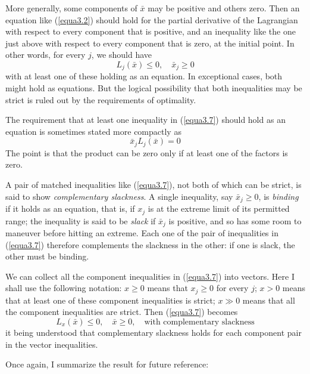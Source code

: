 More generally, some components of $\bar{x}$ may be positive and others zero. Then an equation like (\ref{equa3.2}) should hold for the partial derivative of the Lagrangian with respect to every component that is positive, and an inequality like the one just above with respect to every component that is zero, at the initial point. In other words, for every $j$, we should have
\begin{equation} \label{equa3.7}
L_j(\bar{x}) \leq 0 , \quad \bar{x}_j \geq 0
\end{equation}
with at least one of these holding as an equation. In exceptional cases, both might hold as equations. But the logical possibility that both inequalities may be strict is ruled out by the requirements of optimality.

The requirement that at least one inequality in (\ref{equa3.7}) should hold as an equation is sometimes stated more compactly as
\begin{equation*}
    \bar{x}_j  L_j(\bar{x}) = 0
\end{equation*}
The point is that the product can be zero only if at least one of the factors is zero.

A pair of matched inequalities like (\ref{equa3.7}), not both of which can be strict, is said to show \textit{complementary slackness}. A single inequality, say $\bar{x}_j \geq 0$, is \textit{binding} if it holds as an equation, that is, if $x_j$ is at the extreme limit of its permitted range; the inequality is said to be  \textit{slack} if $\bar{x}_j$ is positive, and so has some room to maneuver before hitting an extreme. Each one of the pair of inequalities in (\ref{equa3.7}) therefore complements the slackness in the other: if one is slack, the other must be binding.

We can collect all the component inequalities in (\ref{equa3.7}) into vectors. Here I shall use the following notation: $x \geq 0$ means that $x_j \geq 0$ for every $j$; $x>0$ means that at least one of these component inequalities is strict; $x \gg 0 $ means that all the component inequalities are strict. Then (\ref{equa3.7}) becomes
\begin{equation*} \tag{3.7}
L_x(\bar{x}) \leq 0 , \quad \bar{x} \geq 0, \quad \mbox{with complementary slackness}
\end{equation*}
it being understood that complementary slackness holds for each component pair in the vector inequalities.

Once again, I summarize the result for future reference:

